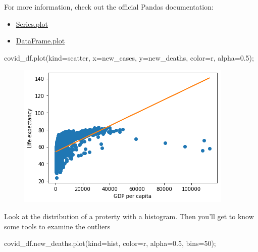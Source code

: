\documentclass[
  letterpaper,
  DIV=11,
  numbers=noendperiod]{scrreprt}
\newenvironment{Shaded}{\begin{snugshade}}{\end{snugshade}}
\newcommand{\DecValTok}[1]{\textcolor[rgb]{0.68,0.00,0.00}{#1}}
\newcommand{\FloatTok}[1]{\textcolor[rgb]{0.68,0.00,0.00}{#1}}
\newcommand{\NormalTok}[1]{\textcolor[rgb]{0.00,0.23,0.31}{#1}}
\newcommand{\OperatorTok}[1]{\textcolor[rgb]{0.37,0.37,0.37}{#1}}
\newcommand{\StringTok}[1]{\textcolor[rgb]{0.13,0.47,0.30}{#1}}
\providecommand{\tightlist}{%
  \setlength{\itemsep}{0pt}\setlength{\parskip}{0pt}}\usepackage{longtable,booktabs,array}
\begin{document}
For more information, check out the official Pandas documentation:

\begin{itemize}
\tightlist
\item
  \href{https://pandas.pydata.org/docs/reference/api/pandas.Series.plot.html}{Series.plot}
\item
  \href{https://pandas.pydata.org/docs/reference/api/pandas.DataFrame.plot.html}{DataFrame.plot}
\end{itemize}

\begin{Shaded}
\begin{Highlighting}[]
\NormalTok{covid\_df.plot(kind}\OperatorTok{=}\StringTok{\textquotesingle{}scatter\textquotesingle{}}\NormalTok{, x}\OperatorTok{=}\StringTok{\textquotesingle{}new\_cases\textquotesingle{}}\NormalTok{, y}\OperatorTok{=}\StringTok{\textquotesingle{}new\_deaths\textquotesingle{}}\NormalTok{, color}\OperatorTok{=}\StringTok{\textquotesingle{}r\textquotesingle{}}\NormalTok{, alpha}\OperatorTok{=}\FloatTok{0.5}\NormalTok{)}\OperatorTok{;}
\end{Highlighting}
\end{Shaded}

\begin{figure}[H]

{\centering \includegraphics{Data visualization_files/figure-pdf/cell-10-output-1.png}

}

\end{figure}

Look at the distribution of a proterty with a histogram. Then you'll get
to know some tools to examine the outliers

\begin{Shaded}
\begin{Highlighting}[]
\NormalTok{covid\_df.new\_deaths.plot(kind}\OperatorTok{=}\StringTok{\textquotesingle{}hist\textquotesingle{}}\NormalTok{, color}\OperatorTok{=}\StringTok{\textquotesingle{}r\textquotesingle{}}\NormalTok{, alpha}\OperatorTok{=}\FloatTok{0.5}\NormalTok{, bins}\OperatorTok{=}\DecValTok{50}\NormalTok{)}\OperatorTok{;}
\end{Highlighting}
\end{Shaded}
\end{document}
